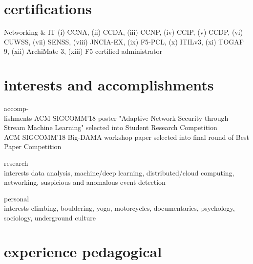 \documentclass[]{friggeri-cv} %
\begin{document}
\section{certifications}
\begin{entrylist}
\entry
{}
{Networking \& IT}
{}
{(i) CCNA, (ii) CCDA, (iii) CCNP, (iv) CCIP, (v) CCDP, (vi) CUWSS, (vii) SENSS, (viii) JNCIA-EX, (ix) F5-PCL, (x) ITILv3, (xi) TOGAF 9, (xii) ArchiMate 3, (xiii) F5 certified administrator}

\end{entrylist}

\section{interests and accomplishments}

\begin{entrylist}

\entry
{accomp-\\lishments}
{ACM SIGCOMM'18 poster "Adaptive Network Security through Stream Machine Learning" selected into Student Research Competition\\ 
ACM SIGCOMM'18 Big-DAMA workshop paper selected into final round of Best Paper Competition}
{}
{}


\entry
{research\\interests}
{data analysis, machine/deep learning, distributed/cloud computing, networking, suspicious and anomalous event detection}
{}
{}


\entry
{personal\\interests}
{climbing, bouldering, yoga, motorcycles, documentaries, psychology, sociology, underground culture}
{}
{}

\end{entrylist}


\iffalse
\section{experience pedagogical}
\end{document}
